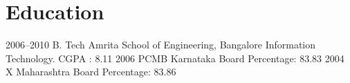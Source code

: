 \documentclass[]{kartikkumar-cv}
\begin{document}
\section{Education}

\begin{entrylist}
  \entry
    {2006–2010}
    {B. Tech }
    {Amrita School of Engineering, Bangalore}
    {Information Technology. CGPA : 8.11}
  \entry
    {2006}
    {PCMB}
    {Karnataka Board}
    {Percentage: 83.83}
  \entry
    {2004}
    {X}
    {Maharashtra Board}
    {Percentage: 83.86}
\end{entrylist}
\end{document}
